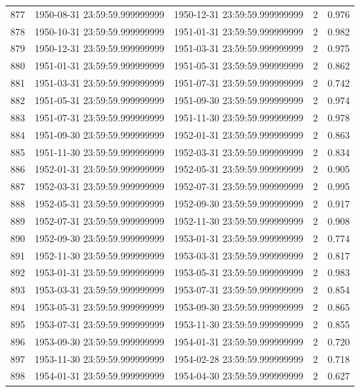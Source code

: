 \begin{table}
\begin{tabular}{lcccc}
877 & 1950-08-31 23:59:59.999999999 & 1950-12-31 23:59:59.999999999 & 2 & 0.976 \\
878 & 1950-10-31 23:59:59.999999999 & 1951-01-31 23:59:59.999999999 & 2 & 0.982 \\
879 & 1950-12-31 23:59:59.999999999 & 1951-03-31 23:59:59.999999999 & 2 & 0.975 \\
880 & 1951-01-31 23:59:59.999999999 & 1951-05-31 23:59:59.999999999 & 2 & 0.862 \\
881 & 1951-03-31 23:59:59.999999999 & 1951-07-31 23:59:59.999999999 & 2 & 0.742 \\
882 & 1951-05-31 23:59:59.999999999 & 1951-09-30 23:59:59.999999999 & 2 & 0.974 \\
883 & 1951-07-31 23:59:59.999999999 & 1951-11-30 23:59:59.999999999 & 2 & 0.978 \\
884 & 1951-09-30 23:59:59.999999999 & 1952-01-31 23:59:59.999999999 & 2 & 0.863 \\
885 & 1951-11-30 23:59:59.999999999 & 1952-03-31 23:59:59.999999999 & 2 & 0.834 \\
886 & 1952-01-31 23:59:59.999999999 & 1952-05-31 23:59:59.999999999 & 2 & 0.905 \\
887 & 1952-03-31 23:59:59.999999999 & 1952-07-31 23:59:59.999999999 & 2 & 0.995 \\
888 & 1952-05-31 23:59:59.999999999 & 1952-09-30 23:59:59.999999999 & 2 & 0.917 \\
889 & 1952-07-31 23:59:59.999999999 & 1952-11-30 23:59:59.999999999 & 2 & 0.908 \\
890 & 1952-09-30 23:59:59.999999999 & 1953-01-31 23:59:59.999999999 & 2 & 0.774 \\
891 & 1952-11-30 23:59:59.999999999 & 1953-03-31 23:59:59.999999999 & 2 & 0.817 \\
892 & 1953-01-31 23:59:59.999999999 & 1953-05-31 23:59:59.999999999 & 2 & 0.983 \\
893 & 1953-03-31 23:59:59.999999999 & 1953-07-31 23:59:59.999999999 & 2 & 0.854 \\
894 & 1953-05-31 23:59:59.999999999 & 1953-09-30 23:59:59.999999999 & 2 & 0.865 \\
895 & 1953-07-31 23:59:59.999999999 & 1953-11-30 23:59:59.999999999 & 2 & 0.855 \\
896 & 1953-09-30 23:59:59.999999999 & 1954-01-31 23:59:59.999999999 & 2 & 0.720 \\
897 & 1953-11-30 23:59:59.999999999 & 1954-02-28 23:59:59.999999999 & 2 & 0.718 \\
898 & 1954-01-31 23:59:59.999999999 & 1954-04-30 23:59:59.999999999 & 2 & 0.627 \\

\end{tabular}
\end{table}
